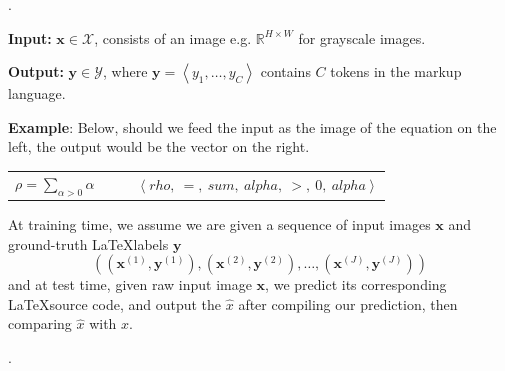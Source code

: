 \documentclass[12pt]{article}
\begin{document}
\label{Final Project}



\p {}. 
\begin{compactitem}
	\item \textbf{Input:} $\bm{x} \in \mathcal{X}$, consists of an image e.g. $\mathbb{R}^{H \times W}$ for grayscale images. 
	\item \textbf{Output:} $\bm{y} \in \mathcal{Y}$, where $\bm{y} = \left<y_1, \ldots, y_C\right>$ contains $C$ tokens in the markup language. 
	\item \textbf{Example}: Below, should we feed the input as the image of the equation on the left, the output would be the vector on the right.
		\begin{center}
		\begin{tabular}{l r} 
		$\rho = \sum_{\alpha > 0} \alpha$ & $\qquad\left<rho,~ =, ~ sum, ~ alpha,~  >, ~ 0,~  alpha\right> $
		\end{tabular}
		\end{center}
\end{compactitem}
\p At training time, we assume we are given a sequence of input images $\bm{x}$ and ground-truth \LaTeX labels $\bm{y}$ $$\left( (\bm{x}^{(1)} , \bm{y}^{(1)}), (\bm{x}^{(2)} , \bm{y}^{(2)}), \ldots, (\bm{x}^{(J)} , \bm{y}^{(J)})  \right) $$and at test time, given raw input image $\bm{x}$, we predict its corresponding \LaTeX source code, and output the $\hat{x}$ after compiling our prediction, then comparing $\hat x$ with $x$. 


\myspace
\p {}. 
\begin{center}
\end{center}
\end{document}
